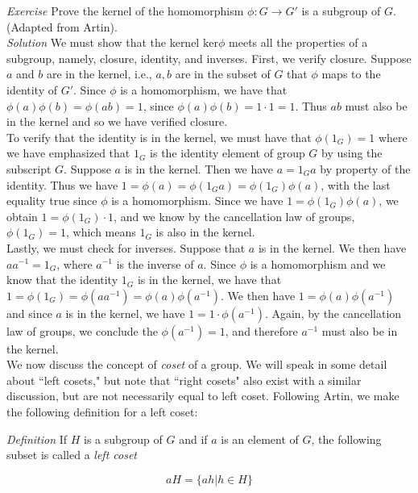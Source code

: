 \textit{Exercise} Prove the kernel of the homomorphism $\phi: G \rightarrow G'$ is a subgroup of $G$. (Adapted from Artin).\\

\textit{Solution} We must show that the kernel $\text{ker} \phi$ meets all the properties of a subgroup, namely, closure, identity, and inverses.  First, we verify closure.  Suppose $a$ and $b$ are in the kernel, i.e., $a,b$ are in the subset of $G$ that $\phi$ maps to the identity of $G'$.  Since $\phi$ is a homomorphism, we have that $\phi(a)\phi(b)=\phi(ab)=1$, since $\phi(a)\phi(b)=1 \cdot 1 = 1$.  Thus $ab$ must also be in the kernel and so we have verified closure.\\  

To verify that the identity is in the kernel, we must have that $\phi(1_{G})=1$ where we have emphasized that $1_{G}$ is the identity element of group $G$ by using the subscript $G$.  Suppose $a$ is in the kernel.  Then we have $a=1_{G}a$ by property of the identity.  Thus we have $1=\phi(a)=\phi(1_{G}a)=\phi(1_{G})\phi(a)$, with the last equality true since $\phi$ is a homomorphism.  Since we have $1=\phi(1_{G})\phi(a)$, we obtain $1=\phi(1_{G})\cdot 1$, and we know by the cancellation law of groups, $\phi(1_{G})=1$, which means $1_{G}$ is also in the kernel.\\

Lastly, we must check for inverses.  Suppose that $a$ is in the kernel.  We then have $aa^{-1}=1_{G}$, where $a^{-1}$ is the inverse of $a$.  Since $\phi$ is a homomorphism and we know that the identity $1_{G}$ is in the kernel, we have that $1=\phi(1_{G})=\phi(aa^{-1})=\phi(a)\phi(a^{-1})$.  We then have $1=\phi(a)\phi(a^{-1})$ and since $a$ is in the kernel, we have $1=1 \cdot \phi(a^{-1})$.  Again, by the cancellation law of groups, we conclude the $\phi(a^{-1})=1$, and therefore $a^{-1}$ must also be in the kernel.\\

We now discuss the concept of \textit{coset} of a group.  We will speak in some detail about ``left cosets," but note that ``right cosets" also exist with a similar discussion, but are not necessarily equal to left coset.  Following Artin, we make the following definition for a left coset:

\textit{Definition} If $H$ is a subgroup of $G$ and if $a$ is an element of $G$, the following subset is called a \textit{left coset}

\begin{displaymath}
aH=\{ah | h \in H \}
\end{displaymath}

